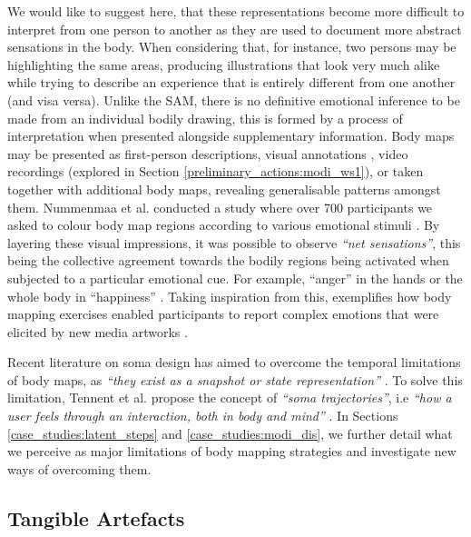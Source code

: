 We would like to suggest here, that these representations become more difficult to interpret from one person to another as they are used to document more abstract sensations in the body. When considering that, for instance, two persons may be highlighting the same areas, producing illustrations that look very much alike while trying to describe an experience that is entirely different from one another (and visa versa). Unlike the SAM, there is no definitive emotional inference to be made from an individual bodily drawing, this is formed by a process of interpretation when presented alongside supplementary information. Body maps may be presented as first-person descriptions, visual annotations \cite{windlin_soma_2019}, video recordings (explored in Section \ref{preliminary_actions:modi_ws1}), or taken together with additional body maps, revealing generalisable patterns amongst them. %
Nummenmaa et al. conducted a study where over 700 participants we asked to colour body map regions according to various emotional stimuli \cite{nummenmaa_bodily_2014}. By layering these visual impressions, it was possible to observe \textit{``net sensations''}, this being the collective agreement towards the bodily regions being activated when subjected to a particular emotional cue. For example, “anger” in the hands or the whole body in “happiness” \cite{davey_where_2021}. Taking inspiration from this, \citeauthor{schino_applying_2021} exemplifies how body mapping exercises enabled participants to report complex emotions that were elicited by new media artworks \cite{schino_applying_2021}.

 Recent literature on soma design has aimed to overcome the temporal limitations of body maps, as \textit{``they exist as a snapshot or state representation''} \cite{tennent_articulating_2021}. To solve this limitation, Tennent et al. propose the concept of \textit{``soma trajectories''}, i.e \textit{``how a user feels through an interaction, both in body and mind''} \cite{tennent_articulating_2021}. In Sections \ref{case_studies:latent_steps} and \ref{case_studies:modi_dis}, we further detail what we perceive as major limitations of body mapping strategies and investigate new ways of overcoming them.

\subsection*{Tangible Artefacts}

